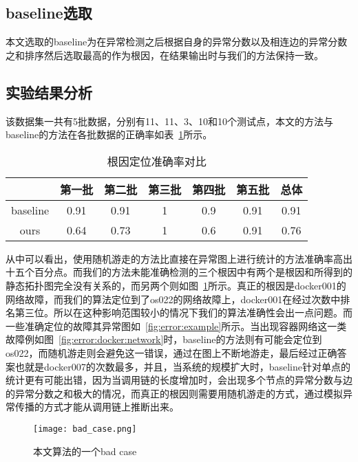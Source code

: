 \subsection{baseline选取}
本文选取的baseline为在异常检测之后根据自身的异常分数以及相连边的异常分数之和排序然后选取最高的作为根因，在结果输出时与我们的方法保持一致。
\subsection{实验结果分析}
该数据集一共有5批数据，分别有11、11、3、10和10个测试点，本文的方法与baseline的方法在各批数据的正确率如表~\ref{tab:rca:result}所示。

\begin{table}
  \centering
  \begin{tabular}{ccccccc}
    \toprule
      & 第一批 & 第二批 & 第三批 & 第四批 & 第五批 & 总体\\
    \midrule
    baseline &  0.91 & 0.91 & 1 & 0.9 & 0.91 & 0.91\\
    ours & 0.64 & 0.73 & 1& 0.6 & 0.91 & 0.76\\
    \bottomrule
  \end{tabular}
  \caption{根因定位准确率对比}
  \label{tab:rca:result}
\end{table}

从中可以看出，使用随机游走的方法比直接在异常图上进行统计的方法准确率高出十五个百分点。而我们的方法未能准确检测的三个根因中有两个是根因和所得到的静态拓扑图完全没有关系的，而另两个则如图~\ref{fig:bad:case}所示。真正的根因是docker001的网络故障，而我们的算法定位到了os022的网络故障上，docker001在经过次数中排名第三位。所以在这种影响范围较小的情况下我们的算法准确性会出一点问题。而一些准确定位的故障其异常图如~\ref{fig:error:example}所示。当出现容器网络这一类故障例如图~\ref{fig:error:docker:network}时，baseline的方法则有可能会定位到os022，而随机游走则会避免这一错误，通过在图上不断地游走，最后经过正确答案也就是docker007的次数最多，并且，当系统的规模扩大时，baseline针对单点的统计更有可能出错，因为当调用链的长度增加时，会出现多个节点的异常分数与边的异常分数之和极大的情况，而真正的根因则需要用随机游走的方式，通过模拟异常传播的方式才能从调用链上推断出来。
\begin{figure}[htbp]
  \centering
  \texttt{[image: bad\_case.png]}
  \caption{本文算法的一个bad case}
  \label{fig:bad:case}
\end{figure}

